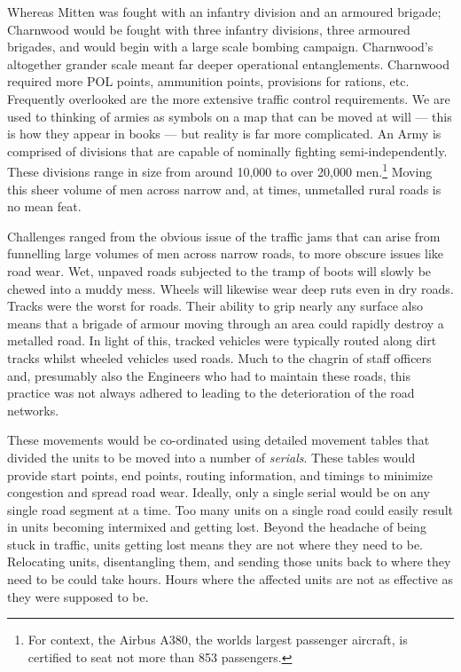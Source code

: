 \documentclass[noraggedright]{turabian-researchpaper}
\begin{document}
Whereas Mitten was fought with an infantry division and an armoured brigade; 
Charnwood would be fought with three infantry divisions, three armoured 
brigades, and would begin with a large scale bombing campaign.  Charnwood's 
altogether grander scale meant far deeper operational entanglements.  
Charnwood required more POL points, ammunition points, provisions for rations,
etc.  Frequently overlooked are the more extensive traffic control 
requirements. %
We are used to thinking of armies as symbols on a map that can be moved at 
will --- this is how they appear in books --- but reality is far more 
complicated.  An Army is comprised of divisions that are capable of nominally 
fighting semi-independently.  These divisions range in size from around 10,000 
to over 20,000 men.\footnote{For context, the Airbus A380, the worlds 
largest passenger aircraft, is certified to seat not more than 853
passengers.%
}  Moving this sheer volume of men across narrow and, at times, unmetalled 
rural roads is no mean feat.

Challenges ranged from the obvious issue of the traffic jams that can arise 
from funnelling large volumes of men across narrow roads, to more obscure 
issues like road wear.  Wet, unpaved roads subjected to the tramp of boots 
will slowly be chewed into a muddy mess.  Wheels will likewise wear deep ruts 
even in dry roads.  Tracks were the worst for roads.  Their ability to grip 
nearly any surface also means that a brigade of armour moving through an area 
could rapidly destroy a metalled road.  In light of this, tracked vehicles 
were typically routed along dirt tracks whilst wheeled vehicles used roads.  
Much to the chagrin of staff officers and, presumably also the Engineers who 
had to maintain these roads, this practice was not always adhered to leading 
to the deterioration of the road networks.\autocite[27 Armd Bde Adm Order No 
8 (See July Appendix)][Para 3]{27wd}

These movements would be co-ordinated using detailed movement tables that 
divided the units to be moved into a number of \textit{serials}.  These 
tables would provide start points, end points, routing information, and 
timings to minimize congestion and spread road wear.  Ideally, only a single 
serial would be on any single road segment at a time.  Too many units on a 
single road could easily result in units becoming intermixed and getting lost.
Beyond the headache of being stuck in traffic, units getting lost means they 
are not where they need to be.  Relocating units, disentangling them, and 
sending those units back to where they need to be could take hours.  Hours 
where the affected units are not as effective as they were supposed to be.  
\end{document}

